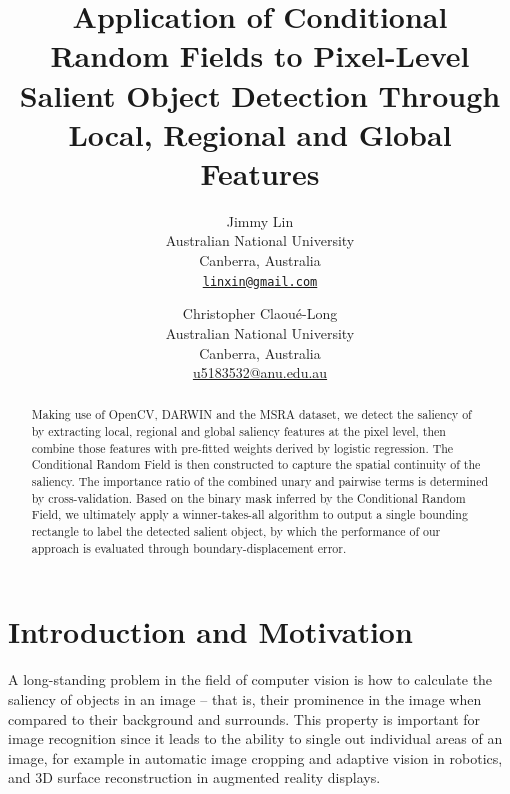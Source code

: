\documentclass[10pt,twocolumn,letterpaper]{article}
\begin{document}
\title{Application of Conditional Random Fields to Pixel-Level Salient Object Detection Through Local, Regional and Global Features}

\author{Jimmy Lin\\
Australian National University\\
Canberra, Australia\\
{\tt\small \url{linxin@gmail.com}}
\and
Christopher Claou\'e-Long\\
Australian National University\\
Canberra, Australia\\
{\small\url{u5183532@anu.edu.au}}
}

\maketitle

\begin{abstract}
    Making use of OpenCV, DARWIN and the MSRA dataset, we detect the saliency of by extracting local, regional and global saliency features at the pixel level, then combine those features with pre-fitted weights derived by logistic regression. The Conditional Random Field is then constructed to capture the spatial continuity of the saliency. The importance ratio of the combined unary and pairwise terms is determined by cross-validation. Based on the binary mask inferred by the Conditional Random Field, we ultimately apply a winner-takes-all algorithm to output a single bounding rectangle to label the detected salient object, by which the performance of our approach is evaluated through boundary-displacement error. 
\end{abstract}

\section{Introduction and Motivation}
A long-standing problem in the field of computer vision is how to calculate the saliency of objects in an image -- that is, their prominence in the image when compared to their background and surrounds.  This property is important for image recognition since it leads to the ability to single out individual areas of an image, for example in automatic image cropping and adaptive vision in robotics, and 3D surface reconstruction in augmented reality displays.
\end{document}
